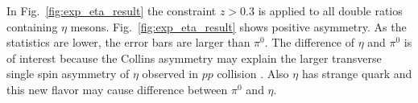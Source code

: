 In Fig.~\ref{fig:exp_eta_result} the constraint $z> 0.3$ is applied to all double ratios containing $\eta$ mesons. Fig.~\ref{fig:exp_eta_result} shows positive asymmetry. As the statistics are lower, the error bars are larger than $\pi^0$. The difference of $\eta$ and $\pi^0$ is of interest because the Collins asymmetry may explain the larger transverse single spin asymmetry of $\eta$ observed in $pp$ collision \cite{StarTSSA1}\cite{StarTSSA2}. Also $\eta$ has strange quark and this new flavor may cause difference between $\pi^0$ and $\eta$.
 
\begin{figure}[H]
  \centering     

\end{figure}
